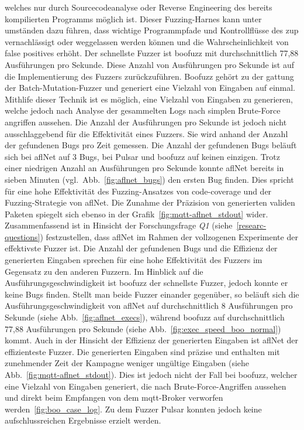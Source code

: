 welches nur durch Sourcecodeanalyse oder Reverse Engineering des bereits kompilierten Programms möglich ist.
Dieser Fuzzing-Harnes kann unter umständen dazu führen, dass wichtige Programmpfade und Kontrollflüsse des \gls{zup}
vernachlässigt oder weggelassen werden können und die Wahrscheinlichkeit von false positives erhöht.\newline
Der schnellste Fuzzer ist boofuzz mit durchschnittlich 77,88 Ausführungen pro Sekunde.
Diese Anzahl von Ausführungen pro Sekunde ist auf die Implementierung des Fuzzers zurückzuführen.
Boofuzz gehört zu der gattung der Batch-Mutation-Fuzzer und generiert eine Vielzahl von Eingaben auf einmal.
Mithlife dieser Technik ist es möglich, eine Vielzahl von Eingaben zu generieren, welche jedoch nach Analyse der gesammelten
Logs nach simplen Brute-Force angriffen aussehen.\newline\newline
Die Anzahl der Ausführungen pro Sekunde ist jedoch nicht ausschlaggebend für die Effektivität eines Fuzzers.
Sie wird anhand der Anzahl der gefundenen Bugs pro Zeit gemessen.
Die Anzahl der gefundenen Bugs beläuft sich bei \gls{afl}Net auf 3 Bugs, bei Pulsar und boofuzz auf keinen einzigen.
Trotz einer niedrigen Anzahl an Ausführungen pro Sekunde konnte \gls{afl}Net bereits in sieben Minuten (vgl.\ Abb.~\ref{fig:aflnet_bugs})
den ersten Bug finden.
Dies spricht für eine hohe Effektivität des Fuzzing-Ansatzes von code-coverage und der Fuzzing-Strategie von \gls{afl}Net.
Die Zunahme der Präzision von generierten validen Paketen spiegelt sich ebenso in der Grafik~\ref{fig:mqtt-aflnet_stdout}
wider.\newline\newline
Zusammenfassend ist in Hinsicht der Forschungsfrage \textit{Q1} (siehe~\ref{researc-questions}) festzustellen, dass
\gls{afl}Net im Rahmen der vollzogenen Experimente der effektivste Fuzzer ist.
Die Anzahl der gefundenen Bugs und die Effizienz der generierten Eingaben sprechen für eine hohe Effektivität des Fuzzers
im Gegensatz zu den anderen Fuzzern.
Im Hinblick auf die Ausführungsgeschwindigkeit ist boofuzz der schnellste Fuzzer, jedoch konnte er keine Bugs finden.
Stellt man beide Fuzzer einander gegenüber, so beläuft sich die Ausführungsgeschwindigkeit von \gls{afl}Net auf durchschnittlich
8 Ausführungen pro Sekunde (siehe Abb.~\ref{fig:aflnet_execs}), während boofuzz auf durchschnittlich 77,88 Ausführungen pro
Sekunde (siehe Abb.~\ref{fig:exec_speed_boo_normal}) kommt.\newline
Auch in der Hinsicht der Effizienz der generierten Eingaben ist \gls{afl}Net der effizienteste Fuzzer.
Die generierten Eingaben sind präzise und enthalten mit zunehmender Zeit der Kampagne weniger ungültige Eingaben (siehe Abb.~\ref{fig:mqtt-aflnet_stdout}).
Dies ist jedoch nicht der Fall bei boofuzz, welcher eine Vielzahl von Eingaben generiert, die nach Brute-Force-Angriffen
aussehen und direkt beim Empfangen von dem \gls{mqtt}-Broker verworfen werden~\ref{fig:boo_case_log}.\newline
Zu dem Fuzzer Pulsar konnten jedoch keine aufschlussreichen Ergebnisse erzielt werden.